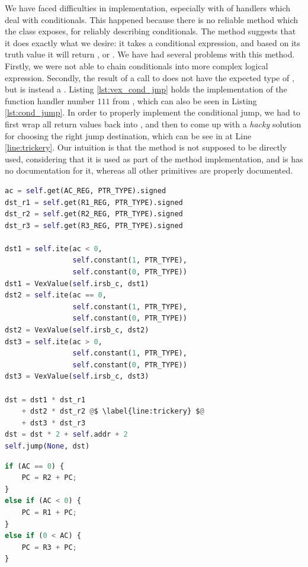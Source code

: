 We have faced difficulties in implementation, especially with of handlers which deal with conditionals. This happened because there is no reliable method which the  class exposes, for reliably describing conditionals. The  method suggests that it does exactly what we desire: it takes a conditional expression, and based on its truth value it will return , or . We have had several problems with this method. Firstly, we were not able to chain conditionals into more complex logical expression. Secondly, the result of a call to  does not have the expected type of , but is instead a . Listing \ref{lst:vex_cond_jmp} holds the implementation of the function handler number $111$ from , which can also be seen in Listing \ref{lst:cond_jump}. In order to properly implement the conditional jump, we had to first wrap all  return values back into , and then to come up with a \emph{hacky} solution for choosing the right jump destination, which can be see in at Line \ref{line:trickery}. Our intuition is that the  method is not supposed to be directly used, considering that it is used as part of the  method implementation, and is has no documentation for it, whereas all other primitives are properly documented.

\begin{center}

\begin{minipage}[t]{.60\textwidth}
\begin{lstlisting}[language=python, label={lst:vex_cond_jmp}, caption={TODO}]
ac = self.get(AC_REG, PTR_TYPE).signed
dst_r1 = self.get(R1_REG, PTR_TYPE).signed
dst_r2 = self.get(R2_REG, PTR_TYPE).signed
dst_r3 = self.get(R3_REG, PTR_TYPE).signed

dst1 = self.ite(ac < 0,
                self.constant(1, PTR_TYPE),
                self.constant(0, PTR_TYPE))
dst1 = VexValue(self.irsb_c, dst1)
dst2 = self.ite(ac == 0,
                self.constant(1, PTR_TYPE),
                self.constant(0, PTR_TYPE))
dst2 = VexValue(self.irsb_c, dst2)
dst3 = self.ite(ac > 0,
                self.constant(1, PTR_TYPE),
                self.constant(0, PTR_TYPE))
dst3 = VexValue(self.irsb_c, dst3)

dst = dst1 * dst_r1 
    + dst2 * dst_r2 @$ \label{line:trickery} $@
    + dst3 * dst_r3
dst = dst * 2 + self.addr + 2
self.jump(None, dst)
\end{lstlisting}
\end{minipage}
\hspace{1.3cm}
\begin{minipage}[t]{.27\textwidth}
\begin{lstlisting}[language=python, label={lst:cond_jmp}, caption={TODO}]
if (AC == 0) {
    PC = R2 + PC;
}
else if (AC < 0) {
    PC = R1 + PC;
}
else if (0 < AC) {
    PC = R3 + PC;
}
\end{lstlisting}
\end{minipage}

\end{center}


